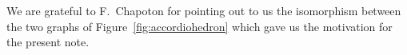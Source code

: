 \documentclass{compositio}
\theoremstyle{definition}
\newcommand{\fref}[1]{Figure~\ref{#1}} %
\begin{document}

\begin{acknowledgements}
We are grateful to F.~Chapoton for pointing out to us the isomorphism between the two graphs of \fref{fig:accordiohedron} which gave us the motivation for the present note.
\end{acknowledgements}



\label{sec:biblio}

\newpage
\end{document}
